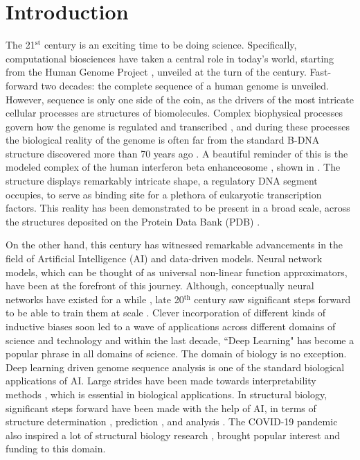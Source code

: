 \section*{Introduction}

The 21$^{\text{st}}$ century is an exciting time to be doing science. Specifically, computational biosciences have taken a central role in today's world, starting from the Human Genome Project \citep{international2001initial}, unveiled at the turn of the century. Fast-forward  two decades: the complete sequence of a human genome  \citep{nurk2022complete} is unveiled. However, sequence is only one side of the coin, as the drivers of the most intricate cellular processes are structures of biomolecules. Complex biophysical processes govern how the genome is regulated and transcribed \citep{lambert2018human}, and during these processes the biological reality of the genome is often far from the standard B-DNA structure discovered more than 70 years ago \citep{watson1953}. A beautiful reminder of this is the modeled complex of the human interferon beta enhanceosome \citep{panne2007atomic}, shown in . The structure displays remarkably intricate shape, a regulatory DNA segment occupies, to serve as binding site for a plethora of eukaryotic transcription factors. This reality has been demonstrated \citep{rohs2009role} to be present in a broad scale, across the structures deposited on the Protein Data Bank (PDB) \citep{berman2000protein}. 

On the other hand, this century has witnessed remarkable advancements in the field of Artificial Intelligence (AI) and data-driven models. Neural network models, which can be thought of as universal non-linear function approximators, have been at the forefront of this journey. Although, conceptually neural networks have existed for a while \citep{kleene1951representationof}, late 20$^{\text{th}}$ century saw significant steps forward to be able to train them at scale \citep{linnainmaa1976taylor, rumelhart1986learning,anderson2000talking,}. Clever incorporation of different kinds of inductive biases soon led to a wave of applications across different domains of science and technology \citep{lecun1989backpropagation, krizhevsky2012imagenet,lecun1998gradient,lecun1995convolutional,deng2009imagenet} and within the last decade, ``Deep Learning" \citep{lecun2015deep} has become a popular phrase in all domains of science. The domain of biology is no exception. Deep learning driven genome sequence analysis \citep{kelley2018sequential} is one of the standard biological applications of AI. Large strides have been made towards interpretability methods \citep{shrikumar2017learning}, which is essential in biological applications. In structural biology, significant steps forward have been made with the help of AI, in terms of structure determination \citep{zhong2021cryodrgn}, prediction \citep{Jumper2021, baek2024na, Baek2021, Krishna2024, Abramson2024}, and analysis \citep{Li2023, li2023geobind, gainza2020deciphering, gainza2023novo}. The COVID-19 pandemic also inspired a lot of structural biology research \citep{he2024ribonanza, yan2022structural, jackson2022mechanisms}, brought popular interest and funding to this domain. 

